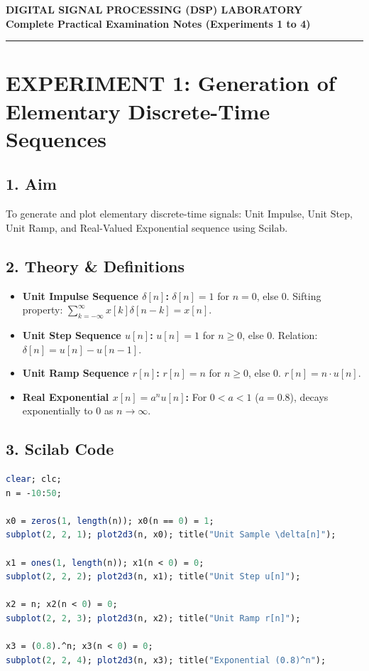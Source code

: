 \documentclass[11pt,a4paper]{article}
\begin{document}
\begin{center}
    {\Large \textbf{\textcolor{headcolor}{DIGITAL SIGNAL PROCESSING (DSP) LABORATORY}}}\\[0.2cm]
    {\large \textbf{Complete Practical Examination Notes (Experiments 1 to 4)}}\\[0.1cm]
    \rule{\linewidth}{0.5mm}
\end{center}

\vspace{0.2cm}

\section*{\textcolor{headcolor}{EXPERIMENT 1: Generation of Elementary Discrete-Time Sequences}}
\subsection*{1. Aim}
To generate and plot elementary discrete-time signals: Unit Impulse, Unit Step, Unit Ramp, and Real-Valued Exponential sequence using Scilab.

\subsection*{2. Theory \& Definitions}
\begin{itemize}
    \item \textbf{Unit Impulse Sequence $\delta[n]$:} $\delta[n] = 1$ for $n = 0$, else $0$. Sifting property: $\sum_{k=-\infty}^{\infty} x[k]\delta[n-k] = x[n]$.
    \item \textbf{Unit Step Sequence $u[n]$:} $u[n] = 1$ for $n \ge 0$, else $0$. Relation: $\delta[n] = u[n] - u[n-1]$.
    \item \textbf{Unit Ramp Sequence $r[n]$:} $r[n] = n$ for $n \ge 0$, else $0$. $r[n] = n \cdot u[n]$.
    \item \textbf{Real Exponential $x[n] = a^n u[n]$:} For $0 < a < 1$ ($a = 0.8$), decays exponentially to 0 as $n \to \infty$.
\end{itemize}

\subsection*{3. Scilab Code}
\begin{lstlisting}[language=Scilab]
clear; clc;
n = -10:50;

x0 = zeros(1, length(n)); x0(n == 0) = 1;
subplot(2, 2, 1); plot2d3(n, x0); title("Unit Sample \delta[n]");

x1 = ones(1, length(n)); x1(n < 0) = 0;
subplot(2, 2, 2); plot2d3(n, x1); title("Unit Step u[n]");

x2 = n; x2(n < 0) = 0;
subplot(2, 2, 3); plot2d3(n, x2); title("Unit Ramp r[n]");

x3 = (0.8).^n; x3(n < 0) = 0;
subplot(2, 2, 4); plot2d3(n, x3); title("Exponential (0.8)^n");
\end{lstlisting}
\end{document}
